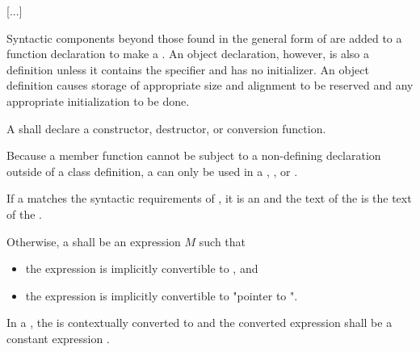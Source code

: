 \documentclass{wg21}
\begin{document}
\pnum
{}%

\textcolor{noteclr}{[...]}

\pnum
{}%
Syntactic components beyond those found in the general form of
 are added to a function declaration to make a
. An object declaration, however, is also
a definition unless it contains the  specifier and has no
initializer.
%
An object definition causes storage of appropriate size and alignment to be reserved and
any appropriate initialization to be done.

\pnum
A  shall declare a
constructor, destructor, or conversion function.
\begin{note}
 Because a member function cannot be subject to a non-defining declaration
 outside of a class definition, a 
 can only be used in a ,
 , or
 .
\end{note}


\begin{addedblock}
\pnum

If a  matches the syntactic requirements of ,
it is an  and the text of the  is the text of the .

Otherwise, a  shall be an expression $M$ such that
\begin{itemize}
    \item the expression  is implicitly convertible to , and
    \item the expression  is implicitly convertible to "pointer to ".
\end{itemize}

\end{addedblock}

In a ,
the  
is contextually converted to  and
the converted expression shall be a constant expression .
\end{document}
